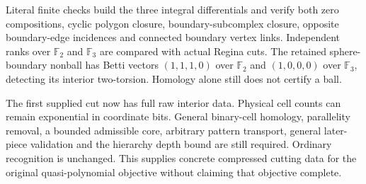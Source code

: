 Literal finite checks build the three integral differentials and verify
both zero compositions, cyclic polygon closure, boundary-subcomplex closure,
opposite boundary-edge incidences and connected boundary vertex links.
Independent ranks over $\mathbb F_2$ and $\mathbb F_3$ are compared with
actual Regina cuts. The retained sphere-boundary nonball has Betti vectors
$(1,1,1,0)$ over $\mathbb F_2$ and $(1,0,0,0)$ over $\mathbb F_3$, detecting
its interior two-torsion. Homology alone still does not certify a ball.

The first supplied cut now has full raw interior data. Physical cell counts
can remain exponential in coordinate bits. General binary-cell homology,
parallelity removal, a bounded admissible core, arbitrary pattern transport,
general later-piece validation and the hierarchy depth bound are still
required. Ordinary recognition is unchanged. This supplies concrete compressed
cutting data for the original quasi-polynomial objective without claiming
that objective complete.
